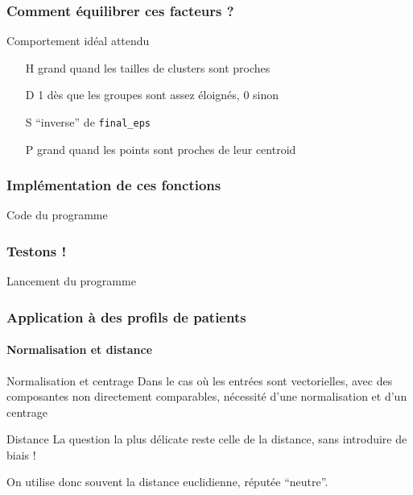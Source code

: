 \documentclass[]{beamer}
\begin{document}
\begin{frame}
  \frametitle{Comment équilibrer ces facteurs ?}

  \begin{block}{Comportement idéal attendu}
    \begin{itemize}
      \item[H] grand quand les tailles de clusters sont proches
      \item[D] 1 dès que les groupes sont assez éloignés, 0 sinon
      \item[S] ``inverse'' de \tt{final\_eps}
      \item[P] grand quand les points sont proches de leur centroid
    \end{itemize}
  \end{block}
\end{frame}


\begin{frame}
  \frametitle{Implémentation de ces fonctions}
  \vfill{}
  \alert{Code du programme}
  \vfill{}
\end{frame}

\begin{frame}
  \frametitle{Testons !}
  \vfill{}
  \alert{Lancement du programme}
  \vfill{}
\end{frame}

\begin{frame}
  \frametitle{Application à des profils de patients}
  \framesubtitle{Normalisation et distance}

  \begin{block}{Normalisation et centrage}
    Dans le cas où les entrées sont vectorielles, avec des composantes non directement comparables, nécessité d'une normalisation et d'un centrage
  \end{block}

  \begin{alertblock}{Distance}
    La question la plus délicate reste celle de la distance, sans introduire de biais !

    On utilise donc souvent la distance euclidienne, réputée ``neutre''.
  \end{alertblock}

\end{frame}
\end{document}
